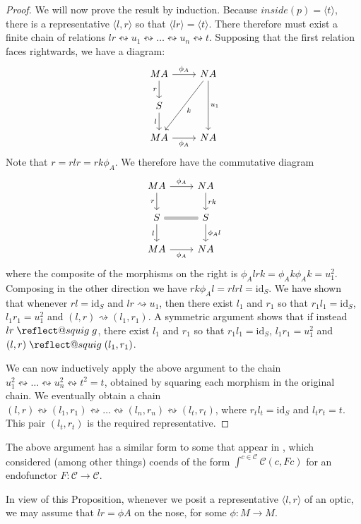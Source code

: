\documentclass[11pt,a4paper]{article}
\makeatletter
\theoremstyle{plain}
\theoremstyle{definition}
\newcommand{\C}{\mathscr{C}}
\newcommand{\id}{\mathrm{id}}
\providecommand{\leftsquigarrow}{%
  \mathrel{\mathpalette\reflect@squig\relax}%
}
\newcommand{\reflect@squig}[2]{%
  \reflectbox{$\m@th#1\rightsquigarrow$}%
}
\makeatother
\begin{document}
\begin{proof}
We will now prove the result by induction. Because $inside(p) = \langle t \rangle$, there is a representative $\langle l, r \rangle$ so that $\langle lr \rangle = \langle t \rangle$. There therefore must exist a finite chain of relations $lr \leftrightsquigarrow u_1 \leftrightsquigarrow \dots \leftrightsquigarrow u_n \leftrightsquigarrow t$.
Supposing that the first relation faces rightwards, we have a diagram:
\[
\begin{tikzcd}
M A \ar[r, "\phi_A"] \ar[d, "r", swap] & N A \ar[dd, "u_1"] \ar[ddl, "k"] \\
S \ar[d,"l",swap] & \\
M A \ar[r, "\phi_A", swap] & N A
\end{tikzcd}
\]
Note that $r = rlr = rk\phi_A$. We therefore have the commutative diagram
\[
\begin{tikzcd}
M A \ar[r, "\phi_A"] \ar[d, "r", swap] & N A \ar[d, "rk"] \\
S \ar[r, equal] \ar[d, "l", swap] & S \ar[d, "\phi_Al"] \\
MA \ar[r, "\phi_A", swap] & N A
\end{tikzcd}
\]
where the composite of the morphisms on the right is $\phi_A l r k = \phi_A k \phi_A k = u_1^2$. Composing in the other direction we have $r k \phi_A l = rlrl = \id_S$. We have shown that whenever $rl = \id_S$ and $lr \rightsquigarrow u_1$, then there exist $l_1$ and $r_1$ so that $r_1l_1 = \id_S$, $l_1r_1 = u_1^2$ and $(l, r) \rightsquigarrow (l_1, r_1)$. A symmetric argument shows that if instead $lr \leftsquigarrow g$, there exist $l_1$ and $r_1$ so that $r_1l_1 = \id_S$, $l_1r_1 = u_1^2$ and $(l, r) \leftsquigarrow (l_1, r_1)$.

We can now inductively apply the above argument to the chain $u_1^2 \leftrightsquigarrow \dots \leftrightsquigarrow u_n^2 \leftrightsquigarrow t^2 = t$, obtained by squaring each morphism in the original chain. We eventually obtain a chain $(l, r) \leftrightsquigarrow (l_1, r_1)\leftrightsquigarrow \dots \leftrightsquigarrow (l_n, r_n) \leftrightsquigarrow (l_t, r_t)$, where $r_tl_t = \id_S$ and $l_t r_t = t$. This pair $(l_t, r_t)$ is the required representative.
\end{proof}

The above argument has a similar form to some that appear in \cite{OnTheTrace}, which considered (among other things) coends of the form $\int^{c \in \C} \C(c, Fc)$ for an endofunctor $F : \C \to \C$.

In view of this Proposition, whenever we posit a representative $\langle l, r \rangle$ of an optic, we may assume that $lr = \phi A$ on the nose, for some $\phi : M \to M$.
\end{document}

